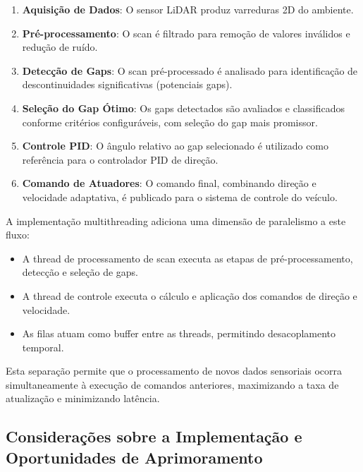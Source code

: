 \begin{enumerate}
    \item \textbf{Aquisição de Dados}: O sensor LiDAR produz varreduras 2D do ambiente.

    \item \textbf{Pré-processamento}: O scan é filtrado para remoção de valores inválidos e redução de ruído.

    \item \textbf{Detecção de Gaps}: O scan pré-processado é analisado para identificação de descontinuidades significativas (potenciais gaps).

    \item \textbf{Seleção do Gap Ótimo}: Os gaps detectados são avaliados e classificados conforme critérios configuráveis, com seleção do gap mais promissor.

    \item \textbf{Controle PID}: O ângulo relativo ao gap selecionado é utilizado como referência para o controlador PID de direção.

    \item \textbf{Comando de Atuadores}: O comando final, combinando direção e velocidade adaptativa, é publicado para o sistema de controle do veículo.
\end{enumerate}

A implementação multithreading adiciona uma dimensão de paralelismo a este
fluxo:

\begin{itemize}
    \item A thread de processamento de scan executa as etapas de pré-processamento,
          detecção e seleção de gaps.
    \item A thread de controle executa o cálculo e aplicação dos comandos de direção e
          velocidade.
    \item As filas atuam como buffer entre as threads, permitindo desacoplamento
          temporal.
\end{itemize}

Esta separação permite que o processamento de novos dados sensoriais ocorra
simultaneamente à execução de comandos anteriores, maximizando a taxa de
atualização e minimizando latência.

\subsection{Considerações sobre a Implementação e Oportunidades de Aprimoramento}

